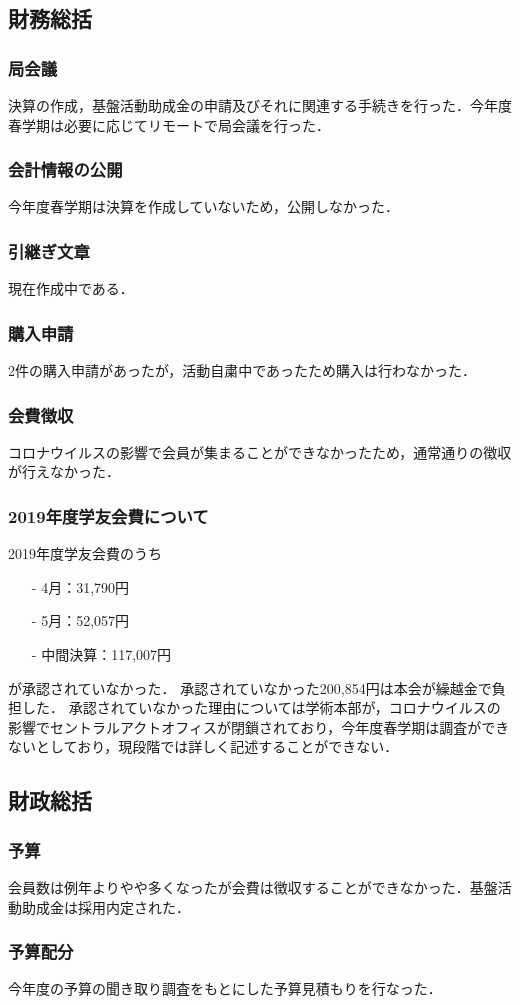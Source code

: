 \subsection*{財務総括}


\subsubsection*{局会議}
決算の作成，基盤活動助成金の申請及びそれに関連する手続きを行った．今年度春学期は必要に応じてリモートで局会議を行った．

\subsubsection*{会計情報の公開}
今年度春学期は決算を作成していないため，公開しなかった．

\subsubsection*{引継ぎ文章}
現在作成中である．

\subsubsection*{購入申請}
2件の購入申請があったが，活動自粛中であったため購入は行わなかった．

\subsubsection*{会費徴収}
コロナウイルスの影響で会員が集まることができなかったため，通常通りの徴収が行えなかった．

\subsubsection*{2019年度学友会費について}
2019年度学友会費のうち
\begin{itemize}
	\item[-]4月：31,790円
	\item[-]5月：52,057円
	\item[-]中間決算：117,007円
\end{itemize}
が承認されていなかった．
承認されていなかった200,854円は本会が繰越金で負担した．
承認されていなかった理由については学術本部が，コロナウイルスの影響でセントラルアクトオフィスが閉鎖されており，今年度春学期は調査ができないとしており，現段階では詳しく記述することができない．


\subsection*{財政総括}


\subsubsection*{予算}
会員数は例年よりやや多くなったが会費は徴収することができなかった．基盤活動助成金は採用内定された．

\subsubsection*{予算配分}
今年度の予算の聞き取り調査をもとにした予算見積もりを行なった．